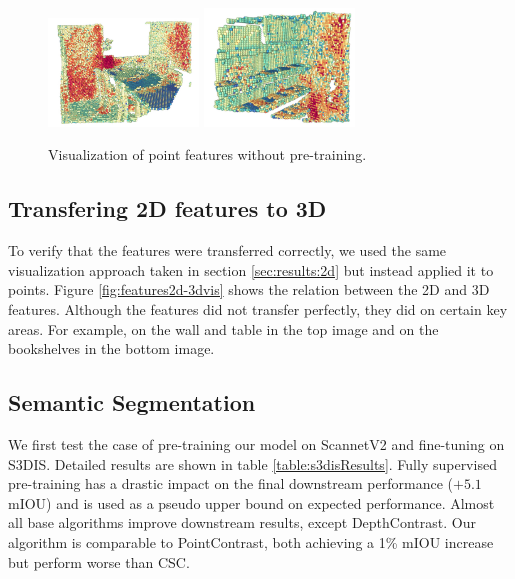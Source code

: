 \documentclass[10pt,twocolumn,letterpaper]{article}
\begin{document}
\begin{figure}
    \centering
    \includegraphics[width=4cm]{images/experiments/scratch-3d.png}
    \includegraphics[width=4cm]{images/experiments/scratch-3d-2.png}
    \caption{Visualization of point features without pre-training.}
    \label{fig:features2dScratchvis}
\end{figure}

\subsection{Transfering 2D features to 3D}
\label{sec:results:2d3d}

To verify that the features were transferred correctly, we used the same visualization approach taken in section \ref{sec:results:2d} but instead applied it to points. Figure \ref{fig:features2d-3dvis} shows the relation between the 2D and 3D features. Although the features did not transfer perfectly, they did on certain key areas. For example, on the wall and table in the top image and on the bookshelves in the bottom image.

\subsection{Semantic Segmentation}
\label{sec:results:semantic}

We first test the case of pre-training our model on ScannetV2 and fine-tuning on S3DIS. Detailed results are shown in table \ref{table:s3disResults}. Fully supervised pre-training has a drastic impact on the final downstream performance ($+5.1$ mIOU) and is used as a pseudo upper bound on expected performance. Almost all base algorithms improve downstream results, except DepthContrast. Our algorithm is comparable to PointContrast, both achieving a 1\% mIOU increase but perform worse than CSC.
\end{document}
